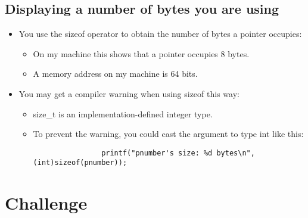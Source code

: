 \subsection{Displaying a number of bytes you are using}
\begin{itemize}
    \item You use the sizeof operator to obtain the number of bytes a pointer occupies:
        \begin{itemize}
            \item On my machine this shows that a pointer occupies 8 bytes.
            \item A memory address on my machine is 64 bits.
        \end{itemize}
    
    \item You may get a compiler warning when using sizeof this way:
        \begin{itemize}
            \item size\_t is an implementation-defined integer type. 
            \item To prevent the warning, you could cast the argument to type int like this: 
            \begin{verbatim}
                printf("pnumber's size: %d bytes\n",(int)sizeof(pnumber)); 
            \end{verbatim}
        \end{itemize}
\end{itemize}


\section{Challenge}



